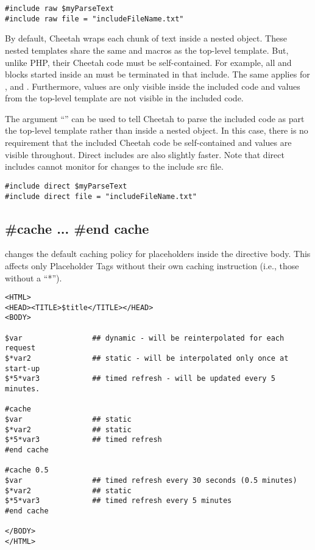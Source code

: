 \begin{verbatim}
#include raw $myParseText
#include raw file = "includeFileName.txt"
\end{verbatim}

By default, Cheetah wraps each chunk of  text inside a nested
 object.  These nested templates share the same 
and macros as the top-level template. But, unlike PHP, their Cheetah code must be
self-contained.  For example, all  and  blocks started
inside an  must be terminated in that include.  The same applies
for ,  and .  Furthermore, 
values are only visible inside the included code and  values from
the top-level template are not visible in the included code.

The argument ``'' can be used to tell Cheetah to parse the included
code as part the top-level template rather than inside a nested 
object.  In this case, there is no requirement that the included Cheetah code be
self-contained and  values are visible throughout.  Direct includes
are also slightly faster.  Note that direct includes cannot monitor for changes
to the include src file.

\begin{verbatim}
#include direct $myParseText
#include direct file = "includeFileName.txt"
\end{verbatim}

\subsection{\#cache ... \#end cache}
\label{directives.cache}

 changes the default caching policy for placeholders inside the
directive body.  This affects only Placeholder Tags without their own caching
instruction (i.e., those without a ``*'').

\begin{verbatim}
<HTML>
<HEAD><TITLE>$title</TITLE></HEAD>
<BODY>

$var                ## dynamic - will be reinterpolated for each request
$*var2              ## static - will be interpolated only once at start-up
$*5*var3            ## timed refresh - will be updated every 5 minutes.

#cache
$var                ## static
$*var2              ## static
$*5*var3            ## timed refresh
#end cache

#cache 0.5
$var                ## timed refresh every 30 seconds (0.5 minutes)
$*var2              ## static
$*5*var3            ## timed refresh every 5 minutes
#end cache

</BODY>
</HTML>
\end{verbatim}


